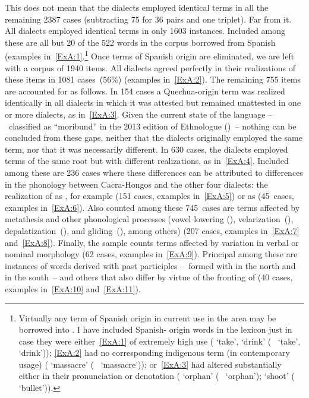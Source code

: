 This does not mean that the dialects employed identical terms in all the remaining 2387 cases (subtracting 75 for 36 pairs and one triplet). Far from it. All dialects employed identical terms in only 1603 instances. Included among these are all but 20 of the 522 words in the corpus borrowed from Spanish (examples in~\ref{ExA:1}.\footnote{Virtually any term of Spanish origin in current use in the area may be borrowed into \SYQ. I have included Spanish- origin words in the lexicon just in case they were either~\ref{ExA:1} of extremely high use ( ‘take’, ‘drink’ (\Sp~ ‘take’, ‘drink’)); \ref{ExA:2} had no corresponding indigenous term (in contemporary usage) ( ‘massacre’ (\Sp~ ‘massacre’)); or~\ref{ExA:3} had altered substantially either in their pronunciation or denotation ( ‘orphan’ (\Sp~ ‘orphan’);  ‘shoot’ (\Sp~ ‘bullet’)).} Once terms of Spanish origin are eliminated, we are left with a corpus of 1940 items. All dialects agreed perfectly in their realizations of these items in 1081 cases~(56\%) (examples in~\ref{ExA:2}). The remaining 755 items are accounted for as follows. In 154 cases a Quechua-origin term was realized identically in all dialects in which it was attested but remained unattested in one or more dialects, as in~\ref{ExA:3}. Given the current state of the language --~classified as “moribund” in the 2013 edition of  { {Ethnologue}} \citet{ethnologue}()~-- nothing can be concluded from these gaps, neither that the dialects originally employed the same term, nor that it was necessarily different. In 630 cases, the dialects employed terms of the same root but with different realizations, as in~\ref{ExA:4}. Included among these are 236 cases where these differences can be attributed to differences in the phonology between Cacra-Hongos and the other four dialects: the realization of \textipa{*[r]} as \textipa{[l]}, for example (151 cases, examples in~\ref{ExA:5}) or  as \textipa{[h]} (45~cases, examples in~\ref{ExA:6}). Also counted among these 745~cases are terms affected by metathesis and other phonological processes (vowel lowering (), velarization~(), depalatization~(), and gliding~(), among others) (207 cases, examples in~\ref{ExA:7} and~\ref{ExA:8}). Finally, the sample counts terms affected by variation in verbal or nominal morphology (62 cases, examples in~\ref{ExA:9}). Principal among these are instances of words derived with past participles --~formed with  in the north and  in the south~-- and others that also differ by virtue of the fronting of  (40 cases, examples in~\ref{ExA:10} and~\ref{ExA:11}).
 
